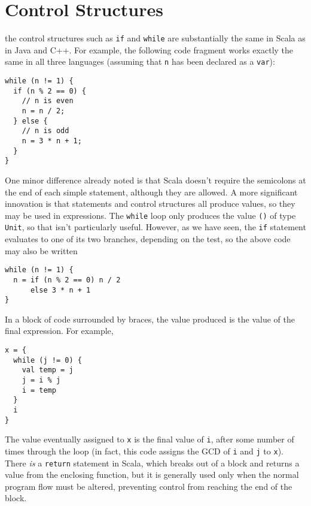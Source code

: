 \section{Control Structures}
 the control structures such as \texttt{if} and \texttt{while} are substantially the same in Scala as in Java and C++. For example, the following code fragment works exactly the same in all three languages (assuming that \verb|n| has been declared as a \verb|var|):
\begin{verbatim}
while (n != 1) {
  if (n % 2 == 0) {
    // n is even
    n = n / 2;
  } else {
    // n is odd
    n = 3 * n + 1;
  }
}
\end{verbatim}
One minor difference already noted is that Scala doesn't require the semicolons at the end of each simple statement, although they are allowed. A more significant innovation is that statements and control structures all produce values, so they may be used in expressions. The \texttt{while} loop only produces the value \texttt{()} of type \texttt{Unit}, so that isn't particularly useful. However, as we have seen, the \texttt{if} statement evaluates to one of its two branches, depending on the test, so the above code may also be written
\begin{verbatim}
while (n != 1) {
  n = if (n % 2 == 0) n / 2
      else 3 * n + 1
}
\end{verbatim}

In a block of code surrounded by braces, the value produced is the value of the final expression. For example,
\begin{verbatim}
x = {
  while (j != 0) {
    val temp = j
    j = i % j
    i = temp
  }
  i
}
\end{verbatim}
The value eventually assigned to \texttt{x} is the final value of \texttt{i}, after some number of times through the loop (in fact, this code assigns the GCD of \texttt{i} and \texttt{j} to \texttt{x}). There \emph{is} a \texttt{return} statement in Scala, which breaks out of a block and returns a value from the enclosing function, but it is generally used only when the normal program flow must be altered, preventing control from reaching the end of the block.

